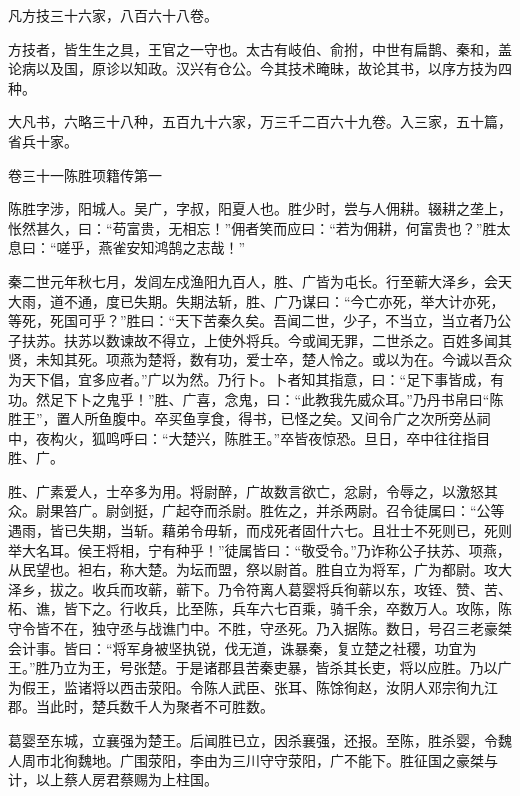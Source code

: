 \documentclass[12pt,UTF8]{ctexbook}
\begin{document}
凡方技三十六家，八百六十八卷。



方技者，皆生生之具，王官之一守也。太古有岐伯、俞拊，中世有扁鹊、秦和，盖论病以及国，原诊以知政。汉兴有仓公。今其技术晻昧，故论其书，以序方技为四种。



大凡书，六略三十八种，五百九十六家，万三千二百六十九卷。入三家，五十篇，省兵十家。





卷三十一陈胜项籍传第一



陈胜字涉，阳城人。吴广，字叔，阳夏人也。胜少时，尝与人佣耕。辍耕之垄上，怅然甚久，曰：“苟富贵，无相忘！”佣者笑而应曰：“若为佣耕，何富贵也？”胜太息曰：“嗟乎，燕雀安知鸿鹄之志哉！”



秦二世元年秋七月，发闾左戍渔阳九百人，胜、广皆为屯长。行至蕲大泽乡，会天大雨，道不通，度已失期。失期法斩，胜、广乃谋曰：“今亡亦死，举大计亦死，等死，死国可乎？”胜曰：“天下苦秦久矣。吾闻二世，少子，不当立，当立者乃公子扶苏。扶苏以数谏故不得立，上使外将兵。今或闻无罪，二世杀之。百姓多闻其贤，未知其死。项燕为楚将，数有功，爱士卒，楚人怜之。或以为在。今诚以吾众为天下倡，宜多应者。”广以为然。乃行卜。卜者知其指意，曰：“足下事皆成，有功。然足下卜之鬼乎！”胜、广喜，念鬼，曰：“此教我先威众耳。”乃丹书帛曰“陈胜王”，置人所鱼腹中。卒买鱼享食，得书，已怪之矣。又间令广之次所旁丛祠中，夜构火，狐鸣呼曰：“大楚兴，陈胜王。”卒皆夜惊恐。旦日，卒中往往指目胜、广。



胜、广素爱人，士卒多为用。将尉醉，广故数言欲亡，忿尉，令辱之，以激怒其众。尉果笞广。尉剑挺，广起夺而杀尉。胜佐之，并杀两尉。召令徒属曰：“公等遇雨，皆已失期，当斩。藉弟令毋斩，而戍死者固什六七。且壮士不死则已，死则举大名耳。侯王将相，宁有种乎！”徒属皆曰：“敬受令。”乃诈称公子扶苏、项燕，从民望也。袒右，称大楚。为坛而盟，祭以尉首。胜自立为将军，广为都尉。攻大泽乡，拔之。收兵而攻蕲，蕲下。乃令符离人葛婴将兵徇蕲以东，攻铚、赞、苦、柘、谯，皆下之。行收兵，比至陈，兵车六七百乘，骑千余，卒数万人。攻陈，陈守令皆不在，独守丞与战谯门中。不胜，守丞死。乃入据陈。数日，号召三老豪桀会计事。皆曰：“将军身被坚执锐，伐无道，诛暴秦，复立楚之社稷，功宜为王。”胜乃立为王，号张楚。于是诸郡县苦秦吏暴，皆杀其长吏，将以应胜。乃以广为假王，监诸将以西击荥阳。令陈人武臣、张耳、陈馀徇赵，汝阴人邓宗徇九江郡。当此时，楚兵数千人为聚者不可胜数。



葛婴至东城，立襄强为楚王。后闻胜已立，因杀襄强，还报。至陈，胜杀婴，令魏人周市北徇魏地。广围荥阳，李由为三川守守荥阳，广不能下。胜征国之豪桀与计，以上蔡人房君蔡赐为上柱国。
\end{document}
